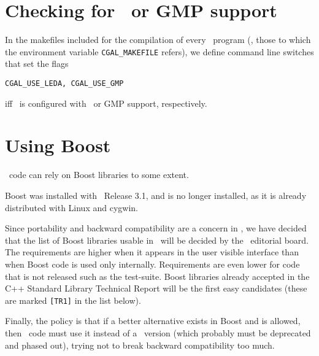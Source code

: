 \section{Checking for \leda\ or GMP support}
\label{sec:leda_gmp_support}

In the makefiles included for the compilation of every \cgal\ program
(\ie, those to which the environment variable {\tt CGAL\_MAKEFILE} refers),
we define command line switches that set the flags 
\begin{verbatim}
CGAL_USE_LEDA, CGAL_USE_GMP
\end{verbatim}
iff \cgal\ is configured with \leda\ or GMP support, respectively.

\section{Using Boost}
\label{sec:boost_support}
\cgal\ code can rely on Boost libraries to some extent.

Boost was installed with \cgal\ Release 3.1, and is no longer
installed, as it is already distributed with Linux and cygwin.  


Since portability and backward compatibility are a concern in \cgal,
we have decided that the list of Boost libraries usable in \cgal\ will be
decided by the \cgal\ editorial board.  The requirements are higher
when it appears in the user visible interface than when Boost code
is used only internally.  Requirements are even lower for code that
is not released such as the test-suite.  Boost libraries already accepted
in the C++ Standard Library Technical Report will be the first easy
candidates (these are marked \texttt{[TR1]} in the list below).

Finally, the policy is that if a better alternative exists in Boost and is
allowed, then \cgal\ code must use it instead of a \cgal\ version (which
probably must be deprecated and phased out), trying not to break backward
compatibility too much.

